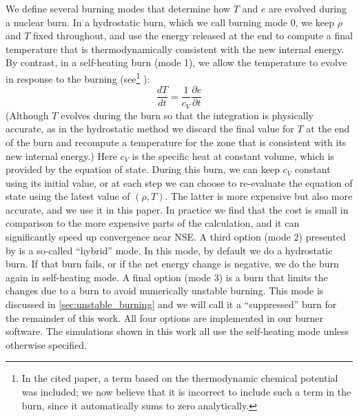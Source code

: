 \documentclass[twocolumn,numberedappendix]{../aastex6}
\begin{document}
We define several burning modes that determine how $T$ and $e$ are evolved
during a nuclear burn. In a hydrostatic burn, which we call burning mode 0,
we keep $\rho$ and $T$ fixed throughout, and use 
the energy released at the end to compute a final temperature that is
thermodynamically consistent with the new internal energy. By contrast,
in a self-heating burn (mode 1), we allow the temperature to evolve in response
to the burning (see\footnote{In the cited paper, a term based on the
thermodynamic chemical potential was included; we now believe
that it is incorrect to include such a term in the burn, since it
automatically sums to zero analytically.} \citet{maestro3}):
\begin{equation}
  \frac{dT}{dt} = \frac{1}{c_V}\frac{\partial e}{\partial t}
\end{equation}
(Although $T$ evolves during the burn so that the integration is physically
accurate, as in the hydrostatic method we discard the final value
for $T$ at the end of the burn and recompute a temperature for the zone that is
consistent with its new internal energy.) Here $c_V$ is the specific heat at
constant volume, which is provided by the equation of state.  During this burn,
we can keep $c_V$ constant using its initial value, or at each step we
can choose to re-evaluate the equation of state using the latest value of $(\rho, T)$.
The latter is more expensive but also more accurate, and we use it in this paper.
In practice we find that the cost is small in comparison to the more expensive
parts of the calculation, and it can significantly speed up convergence near NSE.
A third option (mode 2) presented by \citet{raskin:2010} is a so-called ``hybrid'' mode.
In this mode, by default we do a hydrostatic burn. If that burn fails, or if the net
energy change is negative, we do the burn again in self-heating mode. A final option (mode 3)
is a burn that limits the changes due to a burn to avoid numerically unstable burning.
This mode is discussed in \autoref{sec:unstable_burning} and we will call it a
``suppressed'' burn for the remainder of this work. All four options
are implemented in our burner software. The simulations shown in this work all
use the self-heating mode unless otherwise specified.
\end{document}
